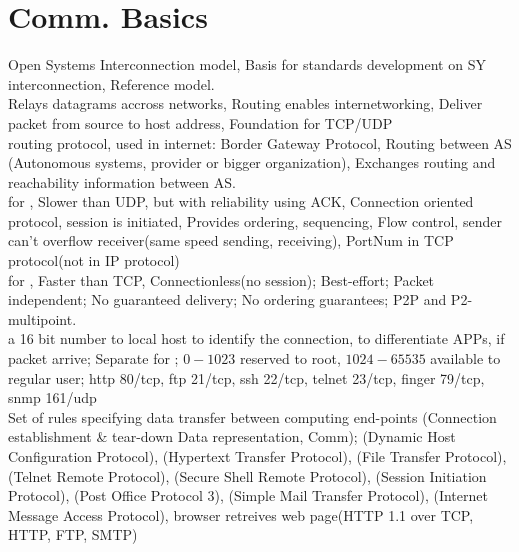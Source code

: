 \section{Comm. Basics}
Open Systems Interconnection model, 
Basis for standards development on SY interconnection,
Reference model.
\textbar
{}
\\ 
Relays datagrams accross networks,
Routing enables internetworking,
Deliver packet from source to host address,
Foundation for TCP/UDP
\\
routing protocol,
 used in internet:
Border Gateway Protocol,
Routing between AS (Autonomous systems, provider or bigger organization),
Exchanges routing and reachability information between AS.
\\
 for ,
Slower than UDP, but with reliability using ACK,
Connection oriented protocol, session is initiated,
Provides ordering, sequencing,
Flow control, sender can't overflow receiver(same speed sending, receiving),
PortNum in TCP protocol(not in IP protocol)
\\
 for ,
Faster than TCP,
Connectionless(no session);
Best-effort;
Packet independent; 
No guaranteed delivery;
No ordering guarantees;
P2P and P2-multipoint.
\\
a 16 bit number to local host to identify the connection, 
to differentiate APPs, if packet arrive;
Separate for ;
$0-1023$ reserved to root,
$1024 - 65535$  available to regular user;
http 80/tcp, ftp 21/tcp, ssh 22/tcp, telnet 23/tcp, finger 79/tcp, snmp 161/udp
\\
Set of rules specifying data transfer
between computing end-points
(Connection establishment \& tear-down
Data representation,
Comm);
 (Dynamic Host Configuration Protocol),
 (Hypertext Transfer Protocol),
 (File Transfer Protocol),
 (Telnet Remote Protocol),
 (Secure Shell Remote Protocol),
 (Session Initiation Protocol),
 (Post Office Protocol 3),
 (Simple Mail Transfer Protocol),
 (Internet Message Access Protocol),
\textbar \textbar
browser retreives web page(HTTP 1.1 over TCP, HTTP, FTP, SMTP)
\\
